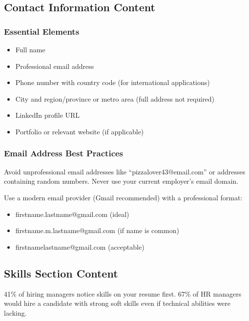 \documentclass[11pt,a4paper]{article}
\begin{document}
\subsection{Contact Information Content}

\subsubsection{Essential Elements}
\begin{itemize}
    \item Full name
    \item Professional email address
    \item Phone number with country code (for international applications)
    \item City and region/province or metro area (full address not required)
    \item LinkedIn profile URL
    \item Portfolio or relevant website (if applicable)
\end{itemize}

\subsubsection{Email Address Best Practices}

\begin{warning}
Avoid unprofessional email addresses like ``pizzalover43@email.com'' or addresses containing random numbers. Never use your current employer's email domain.
\end{warning}

\begin{bestpractice}
Use a modern email provider (Gmail recommended) with a professional format:
\begin{itemize}[noitemsep]
    \item firstname.lastname@gmail.com (ideal)
    \item firstname.m.lastname@gmail.com (if name is common)
    \item firstnamelastname@gmail.com (acceptable)
\end{itemize}
\end{bestpractice}

\subsection{Skills Section Content}

\begin{keystat}
41\% of hiring managers notice skills on your resume first. 67\% of HR managers would hire a candidate with strong soft skills even if technical abilities were lacking.
\end{keystat}
\end{document}
